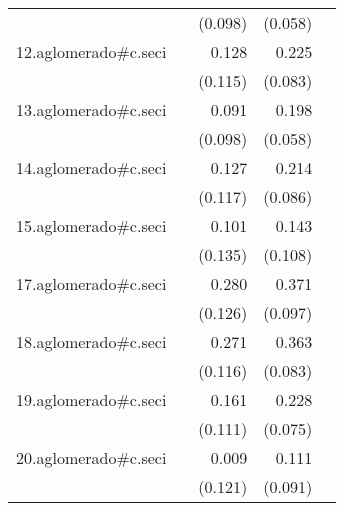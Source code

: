 {\begin{longtable}{l*{4}{D{.}{.}{-1}}}
            &                     &     (0.098)         &     (0.058)         &                     \\
\addlinespace
12.aglomerado#c.seci&                     &       0.128         &       0.225\sym{**} &                     \\
            &                     &     (0.115)         &     (0.083)         &                     \\
\addlinespace
13.aglomerado#c.seci&                     &       0.091         &       0.198\sym{***}&                     \\
            &                     &     (0.098)         &     (0.058)         &                     \\
\addlinespace
14.aglomerado#c.seci&                     &       0.127         &       0.214\sym{*}  &                     \\
            &                     &     (0.117)         &     (0.086)         &                     \\
\addlinespace
15.aglomerado#c.seci&                     &       0.101         &       0.143         &                     \\
            &                     &     (0.135)         &     (0.108)         &                     \\
\addlinespace
17.aglomerado#c.seci&                     &       0.280\sym{*}  &       0.371\sym{***}&                     \\
            &                     &     (0.126)         &     (0.097)         &                     \\
\addlinespace
18.aglomerado#c.seci&                     &       0.271\sym{*}  &       0.363\sym{***}&                     \\
            &                     &     (0.116)         &     (0.083)         &                     \\
\addlinespace
19.aglomerado#c.seci&                     &       0.161         &       0.228\sym{**} &                     \\
            &                     &     (0.111)         &     (0.075)         &                     \\
\addlinespace
20.aglomerado#c.seci&                     &       0.009         &       0.111         &                     \\
            &                     &     (0.121)         &     (0.091)         &                     \\

\end{longtable}}
